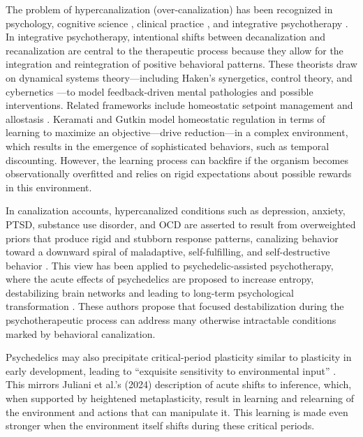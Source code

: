 \documentclass[12pt,fleqn]{article}
\begin{document}
The problem of hypercanalization (over-canalization) has been recognized in psychology, cognitive science \citep{lloyd_understanding_2023}, clinical practice \citep{addicott_primer_2017}, and integrative psychotherapy \citep{schiepek_self-organization_2014, schiepek_integrative_2015, schiepek_psychotherapy_2017}. In integrative psychotherapy, intentional shifts between decanalization and recanalization are central to the therapeutic process because they allow for the integration and reintegration of positive behavioral patterns. These theorists draw on dynamical systems theory---including Haken's \citeyearpar{haken_synergetics_1977} synergetics, control theory, and cybernetics \citep{wiener_cybernetics_2019}---to model feedback-driven mental pathologies and possible interventions. Related frameworks include homeostatic setpoint management and allostasis \citep{sterling_allostasis_1988, sterling_allostasis_2012}. Keramati and Gutkin \citeyearpar{keramati_homeostatic_2014} model homeostatic regulation in terms of learning to maximize an objective---drive reduction---in a complex environment, which results in the emergence of sophisticated behaviors, such as temporal discounting. However, the learning process can backfire if the organism becomes observationally overfitted and relies on rigid expectations about possible rewards in this environment.

In canalization accounts, hypercanalized conditions such as depression, anxiety, PTSD, substance use disorder, and OCD are asserted to result from overweighted priors \citep{carhart-harris_canalization_2023} that produce rigid and stubborn response patterns, canalizing behavior toward a downward spiral of maladaptive, self-fulfilling, and self-destructive behavior \citep{scheffer_dynamical_2024}. This view has been applied to psychedelic-assisted psychotherapy, where the acute effects of psychedelics are proposed to increase entropy, destabilizing brain networks and leading to long-term psychological transformation \citep{carhart-harris_entropic_2014, hipolito_pattern_2023, girn_complex_2023}. These authors propose that focused destabilization during the psychotherapeutic process can address many otherwise intractable conditions marked by behavioral canalization.

Psychedelics may also precipitate critical-period plasticity similar to plasticity in early development, leading to ``exquisite sensitivity to environmental input'' \citep[Abstract]{lepow_critical_2021}. This mirrors Juliani et al.'s (2024) description of acute shifts to inference, which, when supported by heightened metaplasticity, result in learning and relearning of the environment and actions that can manipulate it. This learning is made even stronger when the environment itself shifts during these critical periods.
\end{document}
